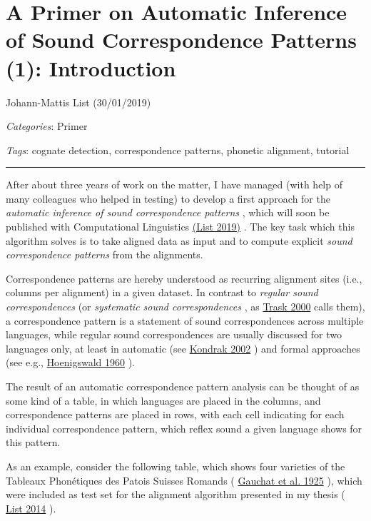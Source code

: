 \documentclass[
  a4paper,
  14pt,
  oneside,
  tablecaptionabove
]{scrbook}
\begin{document}
\newpage
\section*{A Primer on Automatic Inference of Sound Correspondence
Patterns (1): Introduction}

Johann-Mattis List (30/01/2019)

\emph{Categories}: Primer

\emph{Tags}: cognate detection, correspondence patterns, phonetic
alignment, tutorial

\begin{center}\rule{0.5\linewidth}{1pt}\end{center}

After about three years of work on the matter, I have managed (with help
of many colleagues who helped in testing) to develop a first approach
for the \emph{automatic inference of sound correspondence patterns} ,
which will soon be published with Computational Linguistics
\href{http://bibliography.lingpy.org?key=List2019a}{(List 2019)} . The
key task which this algorithm solves is to take aligned data as input
and to compute explicit \emph{sound correspondence patterns} from the
alignments.

Correspondence patterns are hereby understood as recurring alignment
sites (i.e., columns per alignment) in a given dataset. In contrast to
\emph{regular sound correspondences} (or \emph{systematic sound
correspondences} , as
\href{http://bibliography.lingpy.org?key=Trask2000}{Trask 2000} calls
them), a correspondence pattern is a statement of sound correspondences
across multiple languages, while regular sound correspondences are
usually discussed for two languages only, at least in automatic (see
\href{http://bibliography.lingpy.org?key=Kondrak2002a}{Kondrak 2002} )
and formal approaches (see e.g.,
\href{http://bibliography.lingpy.org?key=Hoenigswald1960}{Hoenigswald
1960} ).

The result of an automatic correspondence pattern analysis can be
thought of as some kind of a table, in which languages are placed in the
columns, and correspondence patterns are placed in rows, with each cell
indicating for each individual correspondence pattern, which reflex
sound a given language shows for this pattern.

As an example, consider the following table, which shows four varieties
of the Tableaux Phonétiques des Patois Suisses Romands (
\href{http://bibliography.lingpy.org?key=Gauchat1925}{Gauchat et al.
1925} ), which were included as test set for the alignment algorithm
presented in my thesis (
\href{http://bibliography.lingpy.org?key=List2014d}{List 2014} ).
\end{document}
